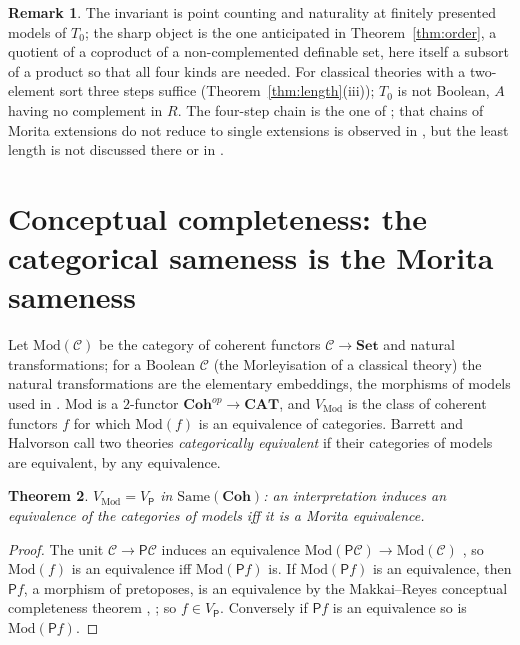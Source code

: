 \documentclass[11pt]{amsart}
\newtheorem{thm}{Theorem}[section]
\theoremstyle{definition}
\newtheorem{rem}[thm]{Remark}
\newcommand{\Same}{\mathrm{Same}}
\newcommand{\Coh}{\mathbf{Coh}}
\newcommand{\Mod}{\mathrm{Mod}}
\newcommand{\Set}{\mathbf{Set}}
\newcommand{\PP}{\mathsf P}
\newcommand{\cC}{\mathcal C}
\begin{document}
\begin{rem}
The invariant is point counting and naturality at finitely presented
models of $T_0$; the sharp object is the one anticipated in
Theorem~\ref{thm:order}, a quotient of a coproduct of a non-complemented
definable set, here itself a subsort of a product so that all four kinds
are needed. For classical theories with a two-element sort three steps
suffice (Theorem~\ref{thm:length}(iii)); $T_0$ is not Boolean, $A$ having
no complement in $R$. The four-step chain is the one of \cite[\S4]{Tsem17};
that chains of Morita extensions do not reduce to single extensions is
observed in \cite[\S6.1]{McEl20}, but the least length is not discussed
there or in \cite{BH16}.
\end{rem}

\section{Conceptual completeness: the categorical sameness is the Morita sameness}\label{sec:cc}

Let $\Mod(\cC)$ be the category of coherent functors $\cC\to\Set$ and
natural transformations; for a Boolean $\cC$ (the Morleyisation of a
classical theory) the natural transformations are the elementary
embeddings, the morphisms of models used in \cite{BH16}. $\Mod$ is a
$2$-functor $\Coh^{op}\to\mathbf{CAT}$, and $V_{\Mod}$ is the class of
coherent functors $f$ for which $\Mod(f)$ is an equivalence of
categories. Barrett and Halvorson call two theories \emph{categorically
equivalent} if their categories of models are equivalent, by any
equivalence.

\begin{thm}\label{thm:cc}
$V_{\Mod}=V_\PP$ in $\Same(\Coh)$: an interpretation induces an
equivalence of the categories of models iff it is a Morita equivalence.
\end{thm}
\begin{proof}
The unit $\cC\to\PP\cC$ induces an equivalence $\Mod(\PP\cC)\to\Mod(\cC)$
\cite[Rem.~13]{LurieNotes}, so $\Mod(f)$ is an equivalence iff $\Mod(\PP
f)$ is. If $\Mod(\PP f)$ is an equivalence, then $\PP f$, a morphism of
pretoposes, is an equivalence by the Makkai--Reyes conceptual
completeness theorem \cite[Ch.~7]{MR77}, \cite[Cor.~12]{LurieNotes};
so $f\in V_\PP$. Conversely if $\PP f$ is an equivalence so is $\Mod(\PP
f)$.
\end{proof}
\end{document}
